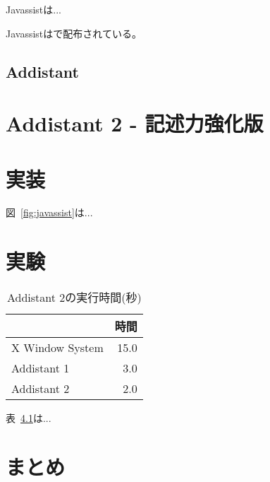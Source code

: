 \documentclass[12pt,twoside]{jbook}
\begin{document}
Javassist\cite{2000ecoop_chiba,2003gpce_chiba}は...

Javassistは\cite{javassist}で配布されている。

\section{Addistant}


\chapter{Addistant 2 - 記述力強化版}

\chapter{実装}


図~\ref{fig:javassist}は...

\chapter{実験}

\begin{table}[tb]
  \centering
  \caption{Addistant 2の実行時間(秒)}
  \label{tab:time}
  \begin{tabular}{lr}
   \hline
                   & 時間 \\
   \hline
   X Window System & 15.0 \\
   Addistant 1     &  3.0 \\
   Addistant 2     &  2.0 \\
   \hline
  \end{tabular}
\end{table}

表~\ref{tab:time}は...

\chapter{まとめ}




%
%




\appendix
\end{document}
